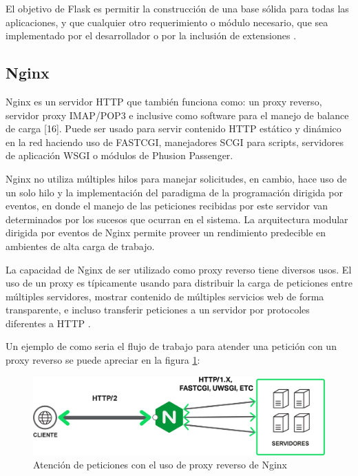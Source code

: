 El objetivo de Flask es permitir la construcción de una base sólida para todas las
aplicaciones, y que cualquier otro requerimiento o módulo necesario, que sea
implementado por el desarrollador o por la inclusión de extensiones \cite{20}.

\subsection{Nginx}

Nginx es un servidor HTTP que también funciona como: un proxy reverso, servidor
proxy IMAP/POP3 e inclusive como software para el manejo de balance de carga [16].
Puede ser usado para servir contenido HTTP estático y dinámico en la red haciendo uso
de FASTCGI, manejadores SCGI para scripts, servidores de aplicación WSGI o módulos
de Phusion Passenger.

Nginx no utiliza múltiples hilos para manejar solicitudes, en cambio, hace uso de un
solo hilo y la implementación del paradigma de la programación dirigida por eventos,
en donde el manejo de las peticiones recibidas por este servidor van determinados por
los sucesos que ocurran en el sistema.
La arquitectura modular dirigida por eventos de
Nginx permite proveer un rendimiento predecible en ambientes de alta carga de
trabajo.

La capacidad de Nginx de ser utilizado como proxy reverso tiene diversos usos.
El uso de un proxy es típicamente usando para distribuir la carga de peticiones
entre múltiples servidores, mostrar contenido de múltiples servicios web de forma transparente,
e incluso transferir peticiones a un servidor por protocoles diferentes a HTTP \cite{22}.

Un ejemplo de como seria el flujo de trabajo para atender una petición con un proxy reverso se puede apreciar en la figura \ref{fig:nginx_reverse_proxy}:

\begin{figure}[H]
	\centering
		\includegraphics[width=.9\textwidth]{figures/nginx_reverse_proxy}
	\caption{Atención de peticiones con el uso de proxy reverso de Nginx}
	\label{fig:nginx_reverse_proxy}
\end{figure}

